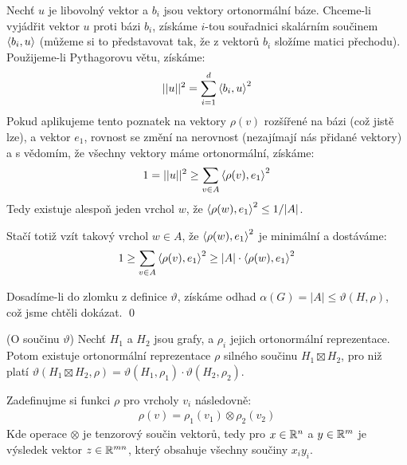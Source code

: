 Nechť $u$ je libovolný vektor a $b_i$ jsou vektory ortonormální báze. Chceme-li vyjádřit vektor $u$ proti bázi $b_i$, získáme $i$-tou souřadnici skalárním součinem ${\langle b_i,u\rangle}$ (můžeme si to představovat tak, že z vektorů $b_i$ složíme matici přechodu). Použijeme-li Pythagorovu větu, získáme:
\begin{align}
	||u||^2 = \sum_{i=1}^d {\langle b_i,u\rangle}^2
\end{align}
Pokud aplikujeme tento poznatek na vektory $\rho(v)$ rozšířené na bázi (což jistě lze), a vektor $e_1$, rovnost se změní na nerovnost (nezajímají nás přidané vektory) a s vědomím, že všechny vektory máme ortonormální, získáme:
\begin{align}
	1=||u||^2 \geq \sum_{v\in A}{\langle \rho(v),e_1\rangle}^2
\end{align}
Tedy existuje alespoň jeden vrchol $w$, že ${\langle \rho(w),e_1\rangle}^2 \leq 1/|A|$.

Stačí totiž vzít takový vrchol $w \in A$, že ${\langle \rho(w),e_1\rangle}^2$ je minimální a dostáváme:
\begin{align}
	1 \geq \sum_{v\in A}{\langle \rho(v),e_1\rangle}^2 \geq |A| \cdot {\langle \rho(w),e_1\rangle}^2
\end{align}

Dosadíme-li do zlomku z definice $\vartheta$, získáme odhad $ \alpha(G) = |A| \leq\vartheta(H,\rho)$, což jsme chtěli dokázat. \qed


\lm (O součinu $\vartheta$) Nechť $H_1$ a $H_2$ jsou grafy, a $\rho_i$ jejich 
ortonormální reprezentace. Potom existuje ortonormální reprezentace $\rho$ 
silného součinu $H_1 \boxtimes H_2$, pro niž platí $\vartheta(H_1 \boxtimes H_2, 
\rho) = \vartheta(H_1, \rho_1) \cdot \vartheta(H_2,\rho_2)$.

\dk Zadefinujme si funkci $\rho$ pro vrcholy $v_i$ následovně:
\begin{align}
	\rho(v) = \rho_1(v_1) \otimes \rho_2(v_2)
\end{align}
Kde operace $\otimes$ je tenzorový součin vektorů, tedy pro $x \in \mathbb{R}^n$ a $y 
\in \mathbb{R}^m$ je výsledek vektor $z \in \mathbb{R}^{mn}$, který obsahuje všechny součiny 
$x_iy_i$. 

